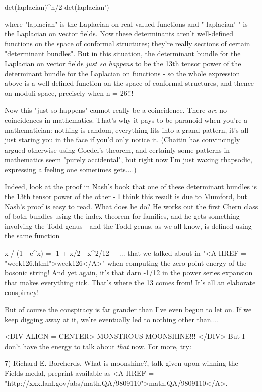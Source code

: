                 det(laplacian)^{n/2} det(laplacian')

where "laplacian" is the Laplacian on real-valued functions
and " laplacian' " is the Laplacian on vector fields.  Now these
determinants aren't well-defined functions on the space of conformal
structures; they're really sections of certain "determinant
bundles".  But in this situation, the determinant bundle for the
Laplacian on vector fields \emph{just so happens} to be the 13th tensor power
of the determinant bundle for the Laplacian on functions - so the whole
expression above is a well-defined function on the space of conformal
structures, and thence on moduli space, precisely when n = 26!!!


Now this "just so happens" cannot really be a coincidence.
There \emph{are} no coincidences in mathematics.  That's why it pays to be
paranoid when you're a mathematician: nothing is random, everything fits
into a grand pattern, it's all just staring you in the face if you'd
only notice it.  (Chaitin has convincingly argued otherwise using
Goedel's theorem, and certainly some patterns in mathematics seem
"purely accidental", but right now I'm just waxing rhapsodic,
expressing a feeling one sometimes gets....)

Indeed, look at the proof in Nash's book that one of these determinant
bundles is the 13th tensor power of the other - I think this result is
due to Mumford, but Nash's proof is easy to read.  What does he do?  He
works out the first Chern class of both bundles using the index theorem
for families, and he gets something involving the Todd genus - and the
Todd genus, as we all know, is defined using the same function

                x / (1 - e^{x}) = -1 + x/2 - x^{2}/12 + ...
that we talked about in "<A HREF = "week126.html">week126</A>"
when computing the zero-point energy of the bosonic string!  And yet
again, it's that darn -1/12 in the power series expansion that makes
everything tick.  That's where the 13 comes from!  It's all an elaborate
conspiracy!

But of course the conspiracy is far grander than I've even begun
to let on.  If we keep digging away at it, we're eventually led to 
nothing other than....

<DIV ALIGN = CENTER>
                       MONSTROUS MOONSHINE!!!
</DIV>
But I don't have the energy to talk about \emph{that} now.  For more, try:

7) Richard E. Borcherds, What is moonshine?, talk given upon winning
the Fields medal, preprint available as <A HREF = "http://xxx.lanl.gov/abs/math.QA/9809110">math.QA/9809110</A>.

